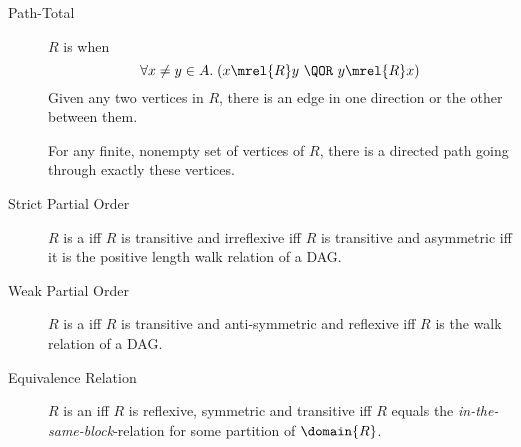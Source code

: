 \begin{description}
\item[Path-Total] $R$ is  when
\[
 \forall x \neq y \in A. \; (x \mrel{R} y\ \QOR\ y \mrel{R} x)
\]
Given any two vertices in $R$, there is an edge in one direction or the
other between them.

For any finite, nonempty set of vertices of $R$, there is a directed path
going through exactly these vertices.

\item[Strict Partial Order] $R$ is a  iff
  $R$ is transitive and irreflexive iff $R$ is transitive and
  asymmetric iff it is the positive length walk relation of a DAG.
  
\item[Weak Partial Order] $R$ is a  iff $R$ is
  transitive and anti-symmetric and reflexive iff $R$ is the walk
  relation of a DAG.

\item[Equivalence Relation] $R$ is an  iff $R$
  is reflexive, symmetric and transitive iff $R$ equals the
  \emph{in-the-same-block}-relation for some partition of $\domain{R}$.

\end{description}

\endinput

